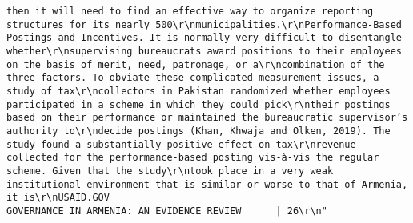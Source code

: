 \documentclass[
]{article}
\begin{document}
\begin{verbatim}
then it will need to find an effective way to organize reporting structures for its nearly 500\r\nmunicipalities.\r\nPerformance-Based Postings and Incentives. It is normally very difficult to disentangle whether\r\nsupervising bureaucrats award positions to their employees on the basis of merit, need, patronage, or a\r\ncombination of the three factors. To obviate these complicated measurement issues, a study of tax\r\ncollectors in Pakistan randomized whether employees participated in a scheme in which they could pick\r\ntheir postings based on their performance or maintained the bureaucratic supervisor’s authority to\r\ndecide postings (Khan, Khwaja and Olken, 2019). The study found a substantially positive effect on tax\r\nrevenue collected for the performance-based posting vis-à-vis the regular scheme. Given that the study\r\ntook place in a very weak institutional environment that is similar or worse to that of Armenia, it is\r\nUSAID.GOV                                                  GOVERNANCE IN ARMENIA: AN EVIDENCE REVIEW      | 26\r\n"                                                                                                                                                                                                                                                                                                                                                                                                                                                                                                                                                                                                                                                                                

\end{verbatim}
\end{document}
